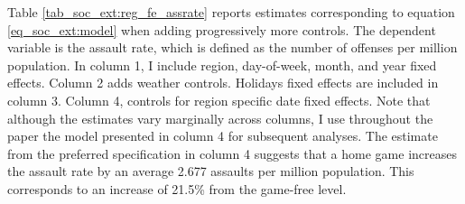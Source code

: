 \documentclass[11pt, a4paper]{article} %
\begin{document}
Table \ref{tab_soc_ext:reg_fe_assrate} reports estimates corresponding to equation \ref{eq_soc_ext:model} when adding progressively more controls. The dependent variable is the assault rate, which is defined as the number of offenses per million population. In column 1, I include region, day-of-week, month, and year fixed effects. Column 2 adds weather controls. Holidays fixed effects are included in column 3. Column 4, controls for region specific date fixed effects. Note that although the estimates vary marginally across columns, I use throughout the paper the model presented in column 4 for subsequent analyses. The estimate from the preferred specification in column 4 suggests that a home game increases the assault rate by an average 2.677 assaults per million population. This corresponds to an increase of 21.5\% from the game-free level.
\end{document}
